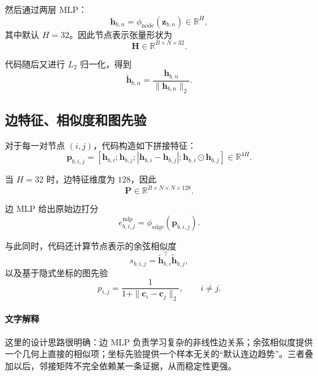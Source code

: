 \documentclass[UTF8]{ctexart}
\begin{document}
然后通过两层 MLP：
\begin{equation}
    \bm{h}_{b,n} = \phi_{\text{node}}(\bm{z}_{b,n}) \in \mathbb{R}^{H},
\end{equation}
其中默认 \(H=32\)。因此节点表示张量形状为
\begin{equation}
    \bm{H} \in \mathbb{R}^{B \times N \times 32}.
\end{equation}

代码随后又进行 \(L_2\) 归一化，得到
\begin{equation}
    \tilde{\bm{h}}_{b,n} = \frac{\bm{h}_{b,n}}{\|\bm{h}_{b,n}\|_2}.
\end{equation}

\subsection{边特征、相似度和图先验}

对于每一对节点 \((i,j)\)，代码构造如下拼接特征：
\begin{equation}
    \bm{p}_{b,i,j}
    =
    [\bm{h}_{b,i}; \bm{h}_{b,j}; |\bm{h}_{b,i} - \bm{h}_{b,j}|; \bm{h}_{b,i} \odot \bm{h}_{b,j}]
    \in \mathbb{R}^{4H}.
\end{equation}

当 \(H=32\) 时，边特征维度为 \(128\)，因此
\begin{equation}
    \bm{P} \in \mathbb{R}^{B \times N \times N \times 128}.
\end{equation}

边 MLP 给出原始边打分
\begin{equation}
    e^{\text{mlp}}_{b,i,j} = \phi_{\text{edge}}(\bm{p}_{b,i,j}).
\end{equation}

与此同时，代码还计算节点表示的余弦相似度
\begin{equation}
    s_{b,i,j} = \tilde{\bm{h}}_{b,i}^{\top}\tilde{\bm{h}}_{b,j},
\end{equation}
以及基于隐式坐标的图先验
\begin{equation}
    p_{i,j} = \frac{1}{1 + \|\bm{c}_i - \bm{c}_j\|_2},
    \qquad i \neq j.
\end{equation}

\paragraph{文字解释}
这里的设计思路很明确：边 MLP 负责学习复杂的非线性边关系；余弦相似度提供一个几何上直接的相似项；坐标先验提供一个样本无关的“默认连边趋势”。三者叠加以后，邻接矩阵不完全依赖某一条证据，从而稳定性更强。
\end{document}
